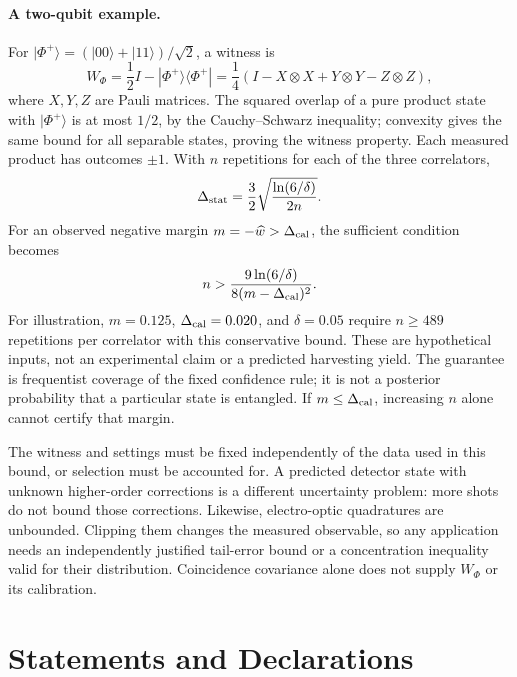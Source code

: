 \documentclass[pdflatex,sn-mathphys-num]{sn-jnl}
\begin{document}
\paragraph{A two-qubit example.}
For $|\Phi^+\rangle=(|00\rangle+|11\rangle)/\sqrt2$, a witness is
\begin{equation}
W_{\Phi}=\frac12I-|\Phi^+\rangle\langle\Phi^+|
=\frac14(I-X\otimes X+Y\otimes Y-Z\otimes Z),
\label{eq:supp-pauli-witness}
\end{equation}
where $X,Y,Z$ are Pauli matrices. The squared overlap of a pure product state with $|\Phi^+\rangle$ is at most $1/2$, by the Cauchy--Schwarz inequality; convexity gives the same bound for all separable states, proving the witness property. Each measured product has outcomes $\pm1$. With $n$ repetitions for each of the three correlators,
\begin{equation}
\Delta_{\rm stat}=\frac32\sqrt{\frac{\ln(6/\delta)}{2n}}.
\end{equation}
For an observed negative margin $m=-\widehat w>\Delta_{\rm cal}$, the sufficient condition becomes
\begin{equation}
n>\frac{9\ln(6/\delta)}{8(m-\Delta_{\rm cal})^2}.
\label{eq:supp-pauli-shot-budget}
\end{equation}
For illustration, $m=0.125$, $\Delta_{\rm cal}=0.020$, and $\delta=0.05$ require $n\geq489$ repetitions per correlator with this conservative bound. These are hypothetical inputs, not an experimental claim or a predicted harvesting yield. The guarantee is frequentist coverage of the fixed confidence rule; it is not a posterior probability that a particular state is entangled. If $m\leq\Delta_{\rm cal}$, increasing $n$ alone cannot certify that margin.

The witness and settings must be fixed independently of the data used in this bound, or selection must be accounted for. A predicted detector state with unknown higher-order corrections is a different uncertainty problem: more shots do not bound those corrections. Likewise, electro-optic quadratures are unbounded. Clipping them changes the measured observable, so any application needs an independently justified tail-error bound or a concentration inequality valid for their distribution. Coincidence covariance alone does not supply $W_{\Phi}$ or its calibration.

\section*{Statements and Declarations}
\end{document}
